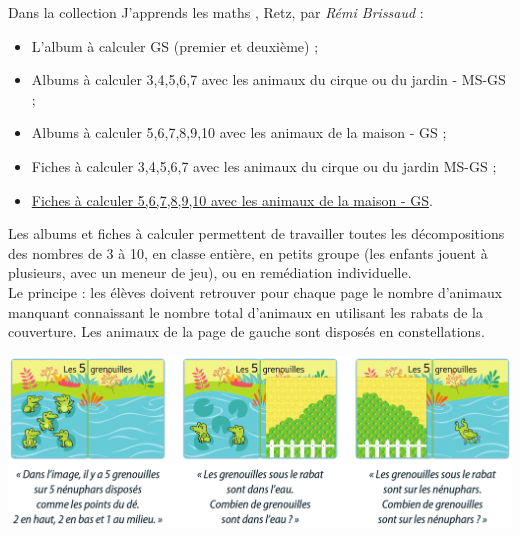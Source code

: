 \begin{exercice*}
\begin{center}
   \end{center}
\end{exercice*}

\bigskip


\begin{exercice*}
   Dans la collection \og J'apprends les maths \fg, Retz, par {\it Rémi Brissaud} :
   \begin{itemize}
      \item L'album à calculer GS (premier et deuxième) ;
      \item Albums à calculer 3,4,5,6,7 avec les animaux du cirque ou du jardin - MS-GS ;
      \item Albums à calculer 5,6,7,8,9,10 avec les animaux de la maison - GS ;
      \item Fiches à calculer 3,4,5,6,7 avec les animaux du cirque ou du jardin MS-GS ;
      \item \href{https://www.youtube.com/watch?v=F_g4T3C0ad0&feature=emb_logo}{Fiches à calculer 5,6,7,8,9,10 avec les animaux de la maison - GS}.
   \end{itemize}
   \medskip
   Les albums et fiches à calculer permettent de travailler toutes les décompositions des nombres de 3 à 10, en classe entière, en petits groupe (les enfants jouent à plusieurs, avec un meneur de jeu), ou en remédiation individuelle. \\
   Le principe : les élèves doivent retrouver pour chaque page le nombre d'animaux manquant connaissant le nombre total d'animaux en utilisant les rabats de la couverture. Les animaux de la page de gauche sont disposés en constellations.
   \begin{center}
      \includegraphics[width=17cm]{Nombres_et_calculs_did/Images/Num1_activites_album_calculer_grenouilles}
   \end{center}
\end{exercice*}

\bigskip


